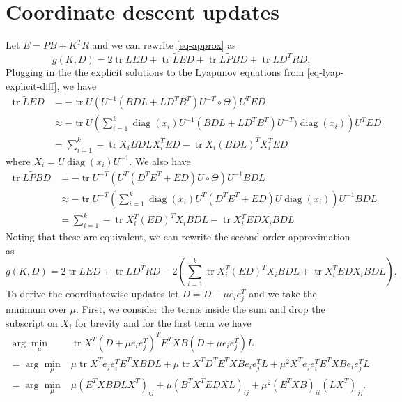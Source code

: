 \documentclass[12pt]{article}
\DeclareMathOperator*{\tr}{\mathrm{tr}}
\DeclareMathOperator*{\diag}{\mathrm{diag}}
\begin{document}
\section{Coordinate descent updates}

Let $E = PB + K^TR$ and we can rewrite \eqref{eq-approx} as
\begin{equation}
g(K,D) = 2 \tr LED + \tr \tilde{L}ED + \tr L\tilde{P}BD + \tr LD^TRD.
\end{equation}
Plugging in the the explicit solutions to the Lyapunov equations from
\eqref{eq-lyap-explicit-diff}, we have
\begin{equation}
\begin{split}
\tr \tilde{L}ED &= - \tr U \left( U^{-1} (BDL + LD^TB^T) U^{-T} \circ \Theta \right) U^TED \\
&\approx - \tr  U\left( \sum_{i=1}^k \diag(x_i) U^{-1}(BDL + LD^TB^T)U^{-T})
  \diag(x_i) \right) U^TED \\
&= \sum_{i=1}^k -\tr X_i BDL X_i^TED  - \tr X_i(BDL)^TX_i^TED
\end{split}
\end{equation}
where $X_i = U\diag(x_i)U^{-1}$. We also have
\begin{equation}
\begin{split}
\tr L\tilde{P}BD &= -\tr U^{-T} \left(U^T (D^TE^T + ED) U \circ \Theta \right)U^{-1}BDL \\
&\approx -\tr U^{-T} \left(\sum_{i=1}^k \diag(x_i) U^T (D^TE^T + ED) U \diag(x_i) \right)U^{-1}BDL \\
&= \sum_{i=1}^k -\tr X_i^T(ED)^TX_iBDL - \tr X_i^TED X_i BDL
\end{split}
\end{equation}
Noting that these are equivalent, we can rewrite the second-order approximation as
\begin{equation}
g(K,D) = 2 \tr LED + \tr LD^TRD - 2 \left( \sum_{i=1}^k \tr X_i^T(ED)^TX_iBDL + \tr X_i^TED X_i BDL \right).
\end{equation}
To derive the coordinatewise updates let $D = D + \mu e_ie_j^T$ and we
take the minimum over $\mu$. First, we consider the terms inside the sum and
drop the subscript on $X_i$ for brevity and for the first term we have
\begin{equation}
\begin{split}
\arg \min_\mu & \tr  X^T(D + \mu e_ie_j^T)^TE^TXB(D + \mu e_ie_j^T)L \\
= \arg \min_\mu & \mu \tr X^Te_je_i^T E^TXBDL + \mu \tr X^TD^TE^TXB e_ie_j^TL +
\mu^2 X^Te_je_i^TE^TXBe_ie_j^TL \\
= \arg\min_\mu & \mu (E^TXBDLX^T)_{ij} + \mu(B^TX^TEDXL)_{ij} + \mu^2(E^TXB)_{ii}(LX^T)_{jj}.
\end{split}
\end{equation}
\end{document}

